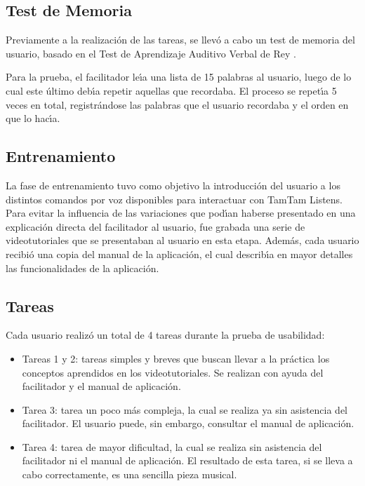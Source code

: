 \subsection{Test de Memoria}
Previamente a la realizaci\'on de las tareas, se llev\'o a cabo un test de memoria del usuario, basado en
el Test de Aprendizaje Auditivo Verbal de Rey \cite{Lopez1998}. 

Para la prueba, el facilitador le{\'\i}a una lista
de 15 palabras al usuario, luego de lo cual este \'ultimo deb{\'\i}a repetir aquellas que recordaba.
El proceso se repet{\'\i}a 5 veces en total, registr\'andose las palabras que el usuario recordaba y el orden en que
lo hac{\'\i}a.

\subsection{Entrenamiento}
La fase de entrenamiento tuvo como objetivo la introducci\'on del usuario a los distintos comandos por voz disponibles
para interactuar con TamTam Listens. 
Para evitar la influencia de las variaciones que pod{\'\i}an haberse presentado en una
explicaci\'on directa del facilitador al usuario, fue grabada una serie de videotutoriales que se presentaban al usuario
en esta etapa.
Adem\'as, cada usuario recibi\'o una copia del manual de la aplicaci\'on, el cual describ{\'\i}a en mayor detalles las
funcionalidades de la aplicaci\'on.

\subsection{Tareas}
Cada usuario realiz\'o un total de 4 tareas durante la prueba de usabilidad:
	\begin{itemize}			
		\item Tareas 1 y 2: tareas simples y breves que buscan llevar a la pr\'actica los conceptos aprendidos en los
		videotutoriales. Se realizan con ayuda del facilitador y el manual de aplicaci\'on.
		\item Tarea 3: tarea un poco m\'as compleja, la cual se realiza ya sin asistencia del facilitador. El usuario puede, sin embargo, consultar el manual de aplicaci\'on.
		\item Tarea 4: tarea de mayor dificultad, la cual se realiza sin asistencia del facilitador ni el manual de
		aplicaci\'on. El resultado de esta tarea, si se lleva a cabo correctamente, es una sencilla pieza musical.
	\end{itemize}

